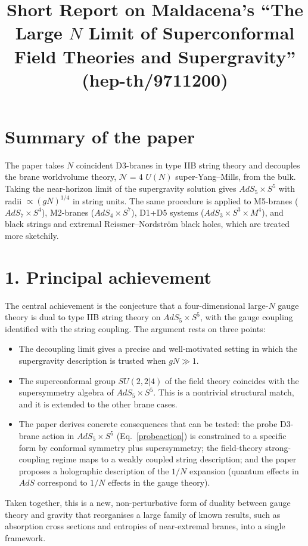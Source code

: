 \documentclass[11pt]{article}
\title{Short Report on Maldacena's ``The Large $N$ Limit of Superconformal Field Theories and Supergravity'' (hep-th/9711200)}
\author{}
\date{}
\begin{document}
\maketitle

\section*{Summary of the paper}

The paper takes $N$ coincident D3-branes in type IIB string theory and decouples the brane worldvolume theory, $\mathcal N=4$ $U(N)$ super-Yang--Mills, from the bulk. Taking the near-horizon limit of the supergravity solution gives $AdS_5\times S^5$ with radii $\propto (gN)^{1/4}$ in string units. The same procedure is applied to M5-branes ($AdS_7\times S^4$), M2-branes ($AdS_4\times S^7$), D1+D5 systems ($AdS_3\times S^3\times M^4$), and black strings and extremal Reissner--Nordstr\"om black holes, which are treated more sketchily.

\section*{1. Principal achievement}

The central achievement is the conjecture that a four-dimensional large-$N$ gauge theory is dual to type IIB string theory on $AdS_5\times S^5$, with the gauge coupling identified with the string coupling. The argument rests on three points:
\begin{itemize}
  \item The decoupling limit gives a precise and well-motivated setting in which the supergravity description is trusted when $gN\gg 1$.
  \item The superconformal group $SU(2,2|4)$ of the field theory coincides with the supersymmetry algebra of $AdS_5\times S^5$. This is a nontrivial structural match, and it is extended to the other brane cases.
  \item The paper derives concrete consequences that can be tested: the probe D3-brane action in $AdS_5\times S^5$ (Eq.~\eqref{probeaction}) is constrained to a specific form by conformal symmetry plus supersymmetry; the field-theory strong-coupling regime maps to a weakly coupled string description; and the paper proposes a holographic description of the $1/N$ expansion (quantum effects in $AdS$ correspond to $1/N$ effects in the gauge theory).
\end{itemize}
Taken together, this is a new, non-perturbative form of duality between gauge theory and gravity that reorganises a large family of known results, such as absorption cross sections and entropies of near-extremal branes, into a single framework.
\end{document}

